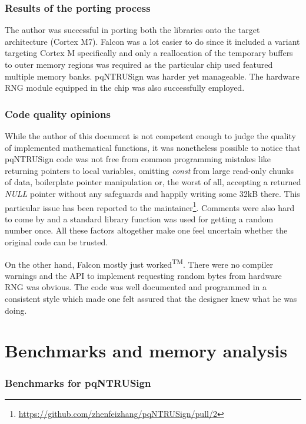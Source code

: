 \documentclass[
]{article}
\begin{document}
\hypertarget{port-results}{%
\section{Results of the porting process}\label{port-results}}

The author was successful in porting both the libraries onto the target architecture (Cortex M7). Falcon was a lot easier to do since it included a variant targeting Cortex M specifically and only a
reallocation of the temporary buffers to outer memory regions was required as the particular chip used featured multiple memory banks. pqNTRUSign was harder yet manageable. The hardware RNG module equipped in the chip was also successfully employed.

\hypertarget{code-quality}{%
\section{Code quality opinions}\label{code-quality}}

While the author of this document is not competent enough to judge the quality of implemented mathematical functions, it was nonetheless possible to notice that pqNTRUSign code was not free from
common programming mistakes like returning pointers to local variables, omitting \textit{const} from large read-only chunks of data, boilerplate pointer manipulation or, the worst of all, accepting a returned \textit{NULL} pointer without any safeguards and happily writing some 32kB there.
This particular issue has been reported to the maintainer\footnote{\url{https://github.com/zhenfeizhang/pqNTRUSign/pull/2}}.
Comments were also hard to come by and a standard library function was used for getting a random number once. All these factors altogether make one feel uncertain whether the original code can be trusted.

On the other hand, Falcon mostly just worked\textsuperscript{TM}. There were no compiler warnings and the API to implement requesting random bytes from hardware RNG was obvious. The code was well documented and programmed in a consistent style which made one felt assured that the designer knew what he was doing.

\hypertarget{benchmarks-all}{%
\part{Benchmarks and memory analysis}\label{benchmarks-all}}

\hypertarget{benchmarks-for-pqntrusign}{%
\section{Benchmarks for pqNTRUSign}\label{benchmarks-for-pqntrusign}}
\end{document}
